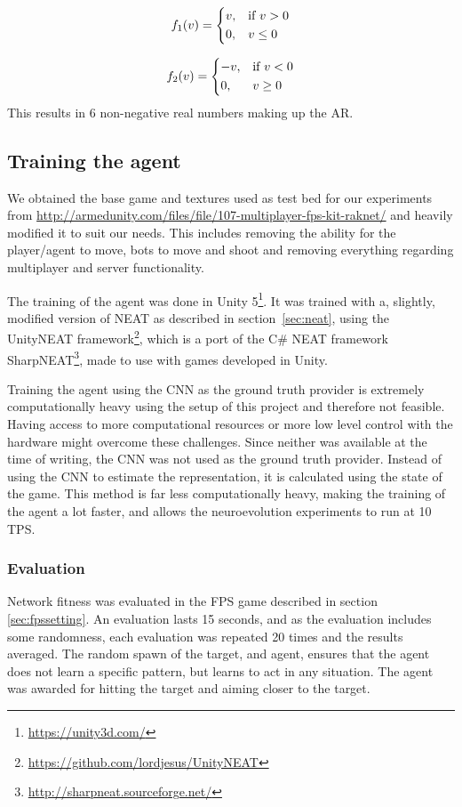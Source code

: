 \[
    f_1(v) =  
\begin{dcases}
    v,& \text{if } v > 0\\
    0,              & v \leq 0
\end{dcases}
\]

\[
    f_2(v) =  
\begin{dcases}
    -v,& \text{if } v < 0\\
    0,              & v \geq 0
\end{dcases}
\]
\noindent
This results in 6 non-negative real numbers making up the AR.

\subsection{Training the agent}
\label{sub:training-neat}
We obtained the base game and textures used as test bed for our experiments from \url{http://armedunity.com/files/file/107-multiplayer-fps-kit-raknet/} and heavily modified it to suit our needs. This includes removing the ability for the player/agent to move, bots to move and shoot and removing everything regarding multiplayer and server functionality. 

The training of the agent was done in Unity 5\footnote{\url{https://unity3d.com/}}.
It was trained with a, slightly, modified version of NEAT as described in section~\ref{sec:neat}, using the UnityNEAT framework\footnote{\url{https://github.com/lordjesus/UnityNEAT}}, which is a port of the C\# NEAT framework SharpNEAT\footnote{\url{http://sharpneat.sourceforge.net/}}, made to use with games developed in Unity.

Training the agent using the CNN as the ground truth provider is extremely computationally heavy using the setup of this project and therefore not feasible. Having access to more computational resources or more low level control with the hardware might overcome these challenges. Since neither was available at the time of writing, the CNN was not used as the ground truth provider. Instead of using the CNN to estimate the representation, it is calculated using the state of the game. This method is far less computationally heavy, making the training of the agent a lot faster, and allows the neuroevolution experiments to run at 10 TPS.

\subsubsection{Evaluation}
Network fitness was evaluated in the FPS game described in section \ref{sec:fpssetting}. An evaluation lasts 15 seconds, and as the evaluation includes some randomness, each evaluation was repeated 20 times and the results averaged. The random spawn of the target, and agent, ensures that the agent does not learn a specific pattern, but learns to act in any situation. The agent was awarded for hitting the target and aiming closer to the target.

